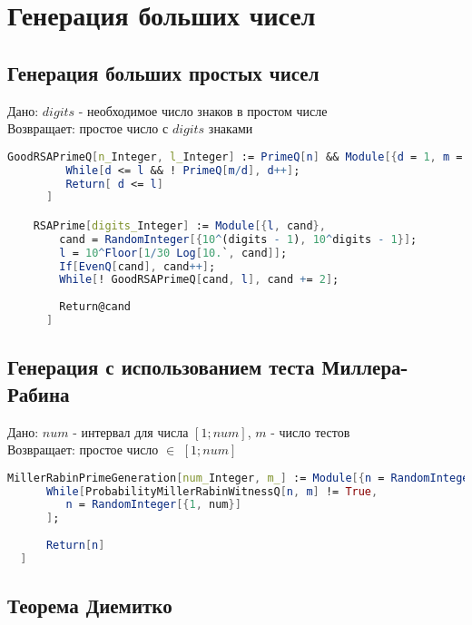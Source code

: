 \chapter{Генерация больших чисел}

  \section{Генерация больших простых чисел}

    Дано: {$digits$} - необходимое число знаков в простом числе \\
    Возвращает: простое число с  {$digits$} знаками

    \begin{lstlisting}[language=Mathematica,caption={
      Генерация больших простых чисел
    }]
    GoodRSAPrimeQ[n_Integer, l_Integer] := PrimeQ[n] && Module[{d = 1, m = (n - 1)/2},
	     While[d <= l && ! PrimeQ[m/d], d++];
	     Return[ d <= l]
	  ]

    RSAPrime[digits_Integer] := Module[{l, cand},
        cand = RandomInteger[{10^(digits - 1), 10^digits - 1}];
        l = 10^Floor[1/30 Log[10.`, cand]];
        If[EvenQ[cand], cand++];
        While[! GoodRSAPrimeQ[cand, l], cand += 2];
        
        Return@cand
      ]

    \end{lstlisting}

  \section{Генерация с использованием теста Миллера-Рабина}

    Дано: {$num$} - интервал для числа {$[1;num]$}, {$m$} - число тестов \\
    Возвращает: простое число {$\in$} {$[1;num]$}

    \begin{lstlisting}[language=Mathematica,caption={
      Генерация с использованием теста Миллера-Рабина  
    }]
  MillerRabinPrimeGeneration[num_Integer, m_] := Module[{n = RandomInteger[{1, num}]},
      While[ProbabilityMillerRabinWitnessQ[n, m] != True, 
         n = RandomInteger[{1, num}]
      ];
      
      Return[n]
  ]
    \end{lstlisting}

  \section{Теорема Диемитко}

